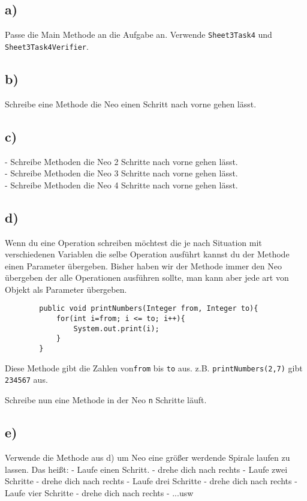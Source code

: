 \subsection*{a)}
	Passe die Main Methode an die Aufgabe an. Verwende \lstinline{Sheet3Task4} und \lstinline{Sheet3Task4Verifier}.
\subsection*{b)}
	Schreibe eine Methode die Neo einen Schritt nach vorne gehen lässt.
\subsection*{c)}
	- Schreibe Methoden die Neo 2 Schritte nach vorne gehen lässt.\\
	- Schreibe Methoden die Neo 3 Schritte nach vorne gehen lässt.\\
	- Schreibe Methoden die Neo 4 Schritte nach vorne gehen lässt.
\subsection*{d)}
	\begin{Infobox}
		Wenn du eine Operation schreiben möchtest die je nach Situation mit verschiedenen Variablen die selbe Operation ausführt kannst du der Methode einen Parameter übergeben. Bisher haben wir der Methode immer den Neo übergeben der alle Operationen ausführen sollte, man kann aber jede art von Objekt als Parameter übergeben.
	
	\begin{lstlisting}
		public void printNumbers(Integer from, Integer to){
			for(int i=from; i <= to; i++){
				System.out.print(i);
			}
		}
	\end{lstlisting}
Diese Methode gibt die Zahlen von\lstinline{from} bis \lstinline{to} aus. z.B. \lstinline{printNumbers(2,7)} gibt  \lstinline{234567} aus.
	\end {Infobox}
Schreibe nun eine Methode in der Neo \lstinline{n} Schritte läuft.
\subsection*{e)}
Verwende die Methode aus d) um Neo eine größer werdende Spirale laufen zu lassen. Das heißt:
- Laufe einen Schritt.
- drehe dich nach rechts
- Laufe zwei Schritte
- drehe dich nach rechts
- Laufe drei Schritte
- drehe dich nach rechts
- Laufe vier Schritte
- drehe dich nach rechts
- ...usw
\newpage